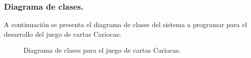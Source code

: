\subsubsection{Diagrama de clases.}\label{cap:diagrama-clases}
A continuación se presenta el diagrama de clases del sistema a programar para el desarrollo del juego de cartas Cariocas:
\begin{figure}[H]
    \centering
    \caption{Diagrama de clases para el juego de cartas Cariocas.}
\end{figure}

\clearpage